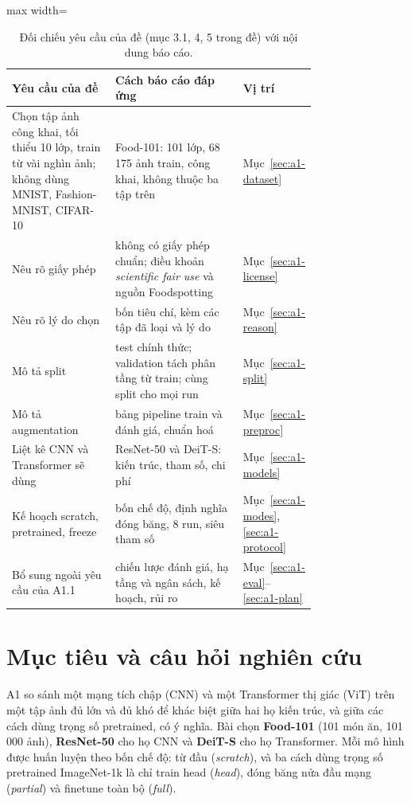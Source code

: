 \begin{table}[htbp]
\centering
\caption{Đối chiếu yêu cầu của đề (mục 3.1, 4, 5 trong đề) với nội dung báo cáo.}
\label{tab:a1-compliance}
\small
\begin{adjustbox}{max width=\linewidth}
\begin{tabular}{p{0.34\linewidth}p{0.42\linewidth}l}
\toprule
Yêu cầu của đề & Cách báo cáo đáp ứng & Vị trí \\
\midrule
Chọn tập ảnh công khai, tối thiểu 10 lớp, train từ vài nghìn ảnh; không dùng MNIST, Fashion-MNIST, CIFAR-10 & Food-101: 101 lớp, 68\,175 ảnh train, công khai, không thuộc ba tập trên & Mục~\ref{sec:a1-dataset} \\
\addlinespace
Nêu rõ giấy phép & không có giấy phép chuẩn; điều khoản \emph{scientific fair use} và nguồn Foodspotting & Mục~\ref{sec:a1-license} \\
\addlinespace
Nêu rõ lý do chọn & bốn tiêu chí, kèm các tập đã loại và lý do & Mục~\ref{sec:a1-reason} \\
\addlinespace
Mô tả split & test chính thức; validation tách phân tầng từ train; cùng split cho mọi run & Mục~\ref{sec:a1-split} \\
\addlinespace
Mô tả augmentation & bảng pipeline train và đánh giá, chuẩn hoá & Mục~\ref{sec:a1-preproc} \\
\addlinespace
Liệt kê CNN và Transformer sẽ dùng & ResNet-50 và DeiT-S: kiến trúc, tham số, chi phí & Mục~\ref{sec:a1-models} \\
\addlinespace
Kế hoạch scratch, pretrained, freeze & bốn chế độ, định nghĩa đóng băng, 8 run, siêu tham số & Mục~\ref{sec:a1-modes}, \ref{sec:a1-protocol} \\
\addlinespace
Bổ sung ngoài yêu cầu của A1.1 & chiến lược đánh giá, hạ tầng và ngân sách, kế hoạch, rủi ro & Mục~\ref{sec:a1-eval}--\ref{sec:a1-plan} \\
\bottomrule
\end{tabular}
\end{adjustbox}
\end{table}

\section{Mục tiêu và câu hỏi nghiên cứu}\label{sec:a1-goals}
A1 so sánh một mạng tích chập (CNN) và một Transformer thị giác (ViT) trên một tập ảnh đủ lớn và đủ khó để khác biệt giữa hai họ kiến trúc, và giữa các cách dùng trọng số pretrained, có ý nghĩa. Bài chọn \textbf{Food-101} (101 món ăn, 101\,000 ảnh), \textbf{ResNet-50} cho họ CNN và \textbf{DeiT-S} cho họ Transformer. Mỗi mô hình được huấn luyện theo bốn chế độ: từ đầu (\emph{scratch}), và ba cách dùng trọng số pretrained ImageNet-1k là chỉ train head (\emph{head}), đóng băng nửa đầu mạng (\emph{partial}) và finetune toàn bộ (\emph{full}).

